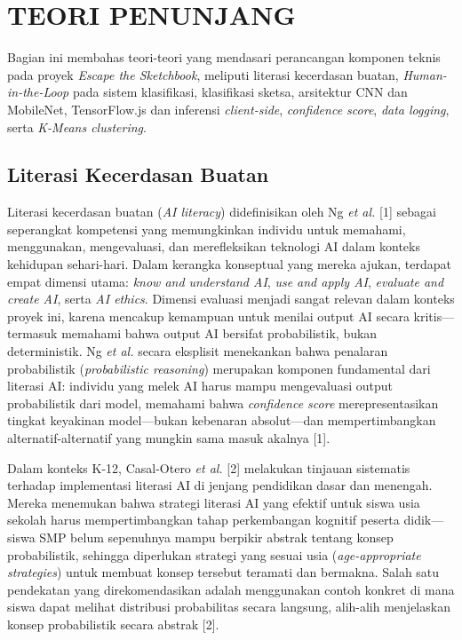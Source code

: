 \documentclass[10pt,twoside,openright]{report}
\begin{document}
\section{TEORI PENUNJANG}
\label{sec:teori-penunjang}

Bagian ini membahas teori-teori yang mendasari perancangan komponen teknis pada proyek \textit{Escape the Sketchbook}, meliputi literasi kecerdasan buatan, \textit{Human-in-the-Loop} pada sistem klasifikasi, klasifikasi sketsa, arsitektur CNN dan MobileNet, TensorFlow.js dan inferensi \textit{client-side}, \textit{confidence score}, \textit{data logging}, serta \textit{K-Means clustering}.

\subsection{Literasi Kecerdasan Buatan}
\label{subsec:literasi-kb}

Literasi kecerdasan buatan (\textit{AI literacy}) didefinisikan oleh Ng \textit{et al.} [1] sebagai seperangkat kompetensi yang memungkinkan individu untuk memahami, menggunakan, mengevaluasi, dan merefleksikan teknologi AI dalam konteks kehidupan sehari-hari. Dalam kerangka konseptual yang mereka ajukan, terdapat empat dimensi utama: \textit{know and understand AI}, \textit{use and apply AI}, \textit{evaluate and create AI}, serta \textit{AI ethics}. Dimensi evaluasi menjadi sangat relevan dalam konteks proyek ini, karena mencakup kemampuan untuk menilai output AI secara kritis—termasuk memahami bahwa output AI bersifat probabilistik, bukan deterministik. Ng \textit{et al.} secara eksplisit menekankan bahwa penalaran probabilistik (\textit{probabilistic reasoning}) merupakan komponen fundamental dari literasi AI: individu yang melek AI harus mampu mengevaluasi output probabilistik dari model, memahami bahwa \textit{confidence score} merepresentasikan tingkat keyakinan model—bukan kebenaran absolut—dan mempertimbangkan alternatif-alternatif yang mungkin sama masuk akalnya [1].

Dalam konteks K-12, Casal-Otero \textit{et al.} [2] melakukan tinjauan sistematis terhadap implementasi literasi AI di jenjang pendidikan dasar dan menengah. Mereka menemukan bahwa strategi literasi AI yang efektif untuk siswa usia sekolah harus mempertimbangkan tahap perkembangan kognitif peserta didik—siswa SMP belum sepenuhnya mampu berpikir abstrak tentang konsep probabilistik, sehingga diperlukan strategi yang sesuai usia (\textit{age-appropriate strategies}) untuk membuat konsep tersebut teramati dan bermakna. Salah satu pendekatan yang direkomendasikan adalah menggunakan contoh konkret di mana siswa dapat melihat distribusi probabilitas secara langsung, alih-alih menjelaskan konsep probabilistik secara abstrak [2].
\end{document}
